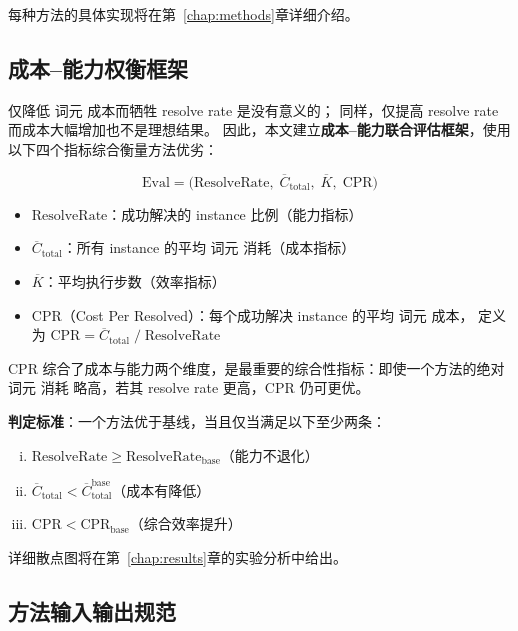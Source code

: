 每种方法的具体实现将在第~\ref{chap:methods}章详细介绍。

\subsection{成本--能力权衡框架}
\label{subsec:cost-capability-tradeoff}

仅降低 词元 成本而牺牲 resolve rate 是没有意义的；
同样，仅提高 resolve rate 而成本大幅增加也不是理想结果。
因此，本文建立\textbf{成本--能力联合评估框架}，使用以下四个指标综合衡量方法优劣：

\begin{equation}
  \text{Eval} = \bigl(\text{ResolveRate},\; \overline{C}_{\text{total}},\; \overline{K},\; \text{CPR}\bigr)
  \label{eq:eval-metrics}
\end{equation}

\begin{itemize}
  \item $\text{ResolveRate}$：成功解决的 instance 比例（能力指标）
  \item $\overline{C}_{\text{total}}$：所有 instance 的平均 词元 消耗（成本指标）
  \item $\overline{K}$：平均执行步数（效率指标）
  \item $\text{CPR}$（Cost Per Resolved）：每个成功解决 instance 的平均 词元 成本，
        定义为 $\text{CPR} = \overline{C}_{\text{total}} \;/\; \text{ResolveRate}$
\end{itemize}

CPR 综合了成本与能力两个维度，是最重要的综合性指标：即使一个方法的绝对 词元 消耗
略高，若其 resolve rate 更高，CPR 仍可更优。

\textbf{判定标准}：一个方法优于基线，当且仅当满足以下至少两条：

\begin{enumerate}[(i)]
  \item $\text{ResolveRate} \geq \text{ResolveRate}_{\text{base}}$（能力不退化）
  \item $\overline{C}_{\text{total}} < \overline{C}_{\text{total}}^{\text{base}}$（成本有降低）
  \item $\text{CPR} < \text{CPR}_{\text{base}}$（综合效率提升）
\end{enumerate}

详细散点图将在第~\ref{chap:results}章的实验分析中给出。

\subsection{方法输入输出规范}
\label{subsec:method-io}

